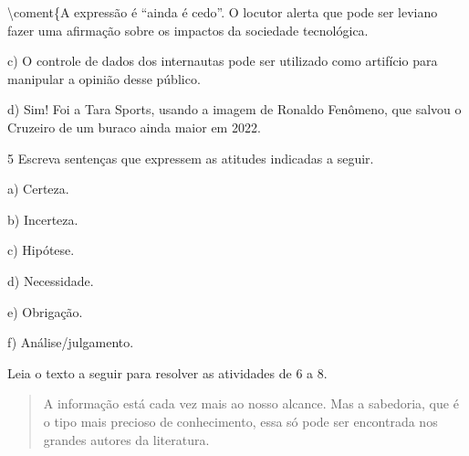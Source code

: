 
\textbackslash coment\{A expressão é ``ainda é cedo''. O locutor alerta
que pode ser leviano fazer uma afirmação sobre os impactos da sociedade
tecnológica.

c) O controle de dados dos internautas pode ser utilizado como artifício
para manipular a opinião desse público.


d) Sim! Foi a Tara Sports, usando a imagem de Ronaldo Fenômeno, que
salvou o Cruzeiro de um buraco ainda maior em 2022.


\num{5} Escreva sentenças que expressem as atitudes indicadas a seguir.

a) Certeza.


b) Incerteza.


c) Hipótese.


d) Necessidade.


e) Obrigação.


f) Análise/julgamento.


Leia o texto a seguir para resolver as atividades de 6 a 8.

\begin{quote}
A informação está cada vez mais ao nosso alcance. Mas a sabedoria, que é
o tipo mais precioso de conhecimento, essa só pode ser encontrada nos
grandes autores da literatura.
\end{quote}


